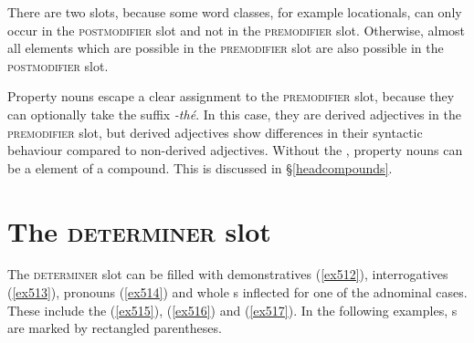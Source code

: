 There are two  slots, because some word classes, for example locationals, can only occur in the \textsc{postmodifier} slot and not in the \textsc{premodifier} slot. Otherwise, almost all elements which are possible in the \textsc{premodifier} slot are also possible in the \textsc{postmodifier} slot.%

Property nouns escape a clear assignment to the \textsc{premodifier} slot, because they can optionally take the  suffix \emph{-thé}. In this case, they are derived adjectives in the \textsc{premodifier} slot, but derived adjectives show differences in their syntactic behaviour compared to non-derived adjectives. Without the , property nouns can be a  element of a  compound. This is discussed in \S{}\ref{headcompounds}.

\section{The \textsc{determiner} slot}\label{npsyntaxdeterminer}

The \textsc{determiner} slot can be filled with demonstratives (\ref{ex512}), interrogatives (\ref{ex513}),  pronouns (\ref{ex514}) and whole s inflected for one of the adnominal cases. These include the  (\ref{ex515}),   (\ref{ex516}) and   (\ref{ex517}). In the following examples, s are marked by rectangled parentheses.

